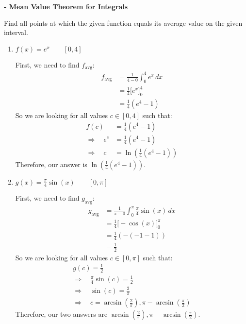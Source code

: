 \documentclass[nooutcomes, handout]{ximera}
\renewcommand{\d}{\,d}
\newcommand{\dfn}{\textbf}
\newcommand{\eval}[1]{\bigg[ #1 \bigg]}
\begin{document}
	
	
	
	
	
	
	
			
			

\begin{problem}
\dfn{- Mean Value Theorem for Integrals}

Find all points at which the given function equals its average value on the given interval.
	\begin{enumerate}
	
	\item  $f(x) = e^x	\qquad	[0,4]$
		\begin{freeResponse}
		First, we need to find $f_{\text{avg}}$:
			\begin{align*}
			f_{\text{avg}} &= \frac{1}{4-0} \int_0^4 e^x \d x  \\
			&= \frac{1}{4} \eval{e^x}_0^4  \\
			&= \frac{1}{4} \left( e^4 - 1 \right)  
			\end{align*}
		So we are looking for all values $c \in [0,4]$ such that:
			\begin{align*}
			f(c) &= \frac{1}{4} (e^4 - 1)  \\
			\Longrightarrow \quad e^c &= \frac{1}{4} (e^4 - 1)  \\
			\Longrightarrow \quad c &= \ln \left( \frac{1}{4} (e^4 - 1) \right)
			\end{align*}
		Therefore, our answer is $\ln \left( \frac{1}{4} (e^4 - 1) \right)$.
		\end{freeResponse}
		
		
		
	\item  $g(x) = \frac{\pi}{4} \sin(x)	\qquad	[0,\pi]$
		\begin{freeResponse}
		First, we need to find $g_{\text{avg}}$:
			\begin{align*}
			g_{\text{avg}} &= \frac{1}{\pi-0} \int_0^{\pi} \frac{\pi}{4} \sin(x) \d x  \\
			&= \frac{1}{4} \eval{-\cos(x)}_0^{\pi}  \\
			&= \frac{1}{4} \left( - (-1-1) \right)  \\
			&= \frac{1}{2}
			\end{align*}
		So we are looking for all values $c \in [0,\pi]$ such that:
			\begin{align*}
			&g(c) = \frac{1}{2}  \\
			&\Longrightarrow \quad \frac{\pi}{4} \sin(c) = \frac{1}{2}  \\
			&\Longrightarrow \quad \sin(c) = \frac{2}{\pi}  \\
			&\Longrightarrow \quad c = \arcsin \left( \frac{2}{\pi} \right), \pi - \arcsin \left( \frac{\pi}{2} \right)
			&\end{align*}
		Therefore, our two answers are $\arcsin \left( \frac{2}{\pi} \right), \pi - \arcsin \left( \frac{\pi}{2} \right)$.
		\end{freeResponse}
		

\end{enumerate}
\end{problem}
\end{document}
